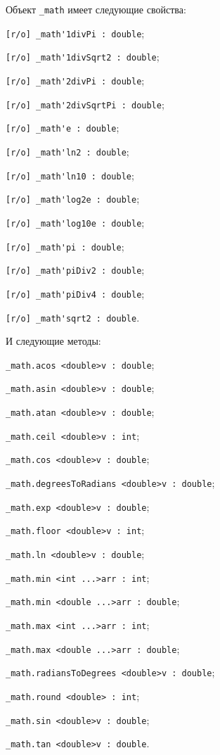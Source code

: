 Объект \lstinline|_math| имеет следующие свойства:
\begin{icItems}
	\item \lstinline|[r/o] _math'1divPi : double|;
	\item \lstinline|[r/o] _math'1divSqrt2 : double|;
	\item \lstinline|[r/o] _math'2divPi : double|;
	\item \lstinline|[r/o] _math'2divSqrtPi : double|;
	\item \lstinline|[r/o] _math'e : double|;
	\item \lstinline|[r/o] _math'ln2 : double|;
	\item \lstinline|[r/o] _math'ln10 : double|;
	\item \lstinline|[r/o] _math'log2e : double|;
	\item \lstinline|[r/o] _math'log10e : double|;
	\item \lstinline|[r/o] _math'pi : double|;
	\item \lstinline|[r/o] _math'piDiv2 : double|;
	\item \lstinline|[r/o] _math'piDiv4 : double|;
	\item \lstinline|[r/o] _math'sqrt2 : double|.
\end{icItems}

И следующие методы:
\begin{icItems}
	\item \lstinline|_math.acos <double>v : double|;
	\item \lstinline|_math.asin <double>v : double|;
	\item \lstinline|_math.atan <double>v : double|;
	\item \lstinline|_math.ceil <double>v : int|;
	\item \lstinline|_math.cos <double>v : double|;
	\item \lstinline|_math.degreesToRadians <double>v : double|;
	\item \lstinline|_math.exp <double>v : double|;
	\item \lstinline|_math.floor <double>v : int|;
	\item \lstinline|_math.ln <double>v : double|;
	\item \lstinline|_math.min <int ...>arr : int|;
	\item \lstinline|_math.min <double ...>arr : double|;
	\item \lstinline|_math.max <int ...>arr : int|;
	\item \lstinline|_math.max <double ...>arr : double|;
	\item \lstinline|_math.radiansToDegrees <double>v : double|;
	\item \lstinline|_math.round <double> : int|;
	\item \lstinline|_math.sin <double>v : double|;
	\item \lstinline|_math.tan <double>v : double|.
\end{icItems}

